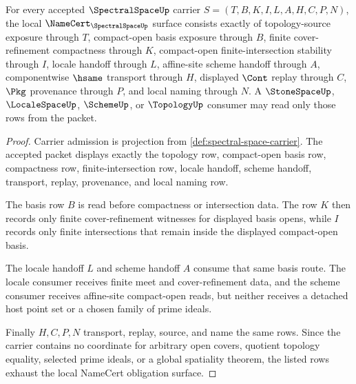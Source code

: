 \begin{theorem}
\label{thm:spectral-space-namecert-obligations}
For every accepted $\SpectralSpaceUp$ carrier $S=(T,B,K,I,L,A,H,C,P,N)$, the local $\NameCert_{\SpectralSpaceUp}$ surface consists exactly of topology-source exposure through $T$, compact-open basis exposure through $B$, finite cover-refinement compactness through $K$, compact-open finite-intersection stability through $I$, locale handoff through $L$, affine-site scheme handoff through $A$, componentwise $\hsame$ transport through $H$, displayed $\Cont$ replay through $C$, $\Pkg$ provenance through $P$, and local naming through $N$. A $\StoneSpaceUp$, $\LocaleSpaceUp$, $\SchemeUp$, or $\TopologyUp$ consumer may read only those rows from the packet.
\end{theorem}
\begin{proof}
Carrier admission is projection from \autoref{def:spectral-space-carrier}. The accepted packet displays exactly the topology row, compact-open basis row, compactness row, finite-intersection row, locale handoff, scheme handoff, transport, replay, provenance, and local naming row.

The basis row $B$ is read before compactness or intersection data. The row $K$ then records only finite cover-refinement witnesses for displayed basis opens, while $I$ records only finite intersections that remain inside the displayed compact-open basis.

The locale handoff $L$ and scheme handoff $A$ consume that same basis route. The locale consumer receives finite meet and cover-refinement data, and the scheme consumer receives affine-site compact-open reads, but neither receives a detached host point set or a chosen family of prime ideals.

Finally $H,C,P,N$ transport, replay, source, and name the same rows. Since the carrier contains no coordinate for arbitrary open covers, quotient topology equality, selected prime ideals, or a global spatiality theorem, the listed rows exhaust the local NameCert obligation surface.
\end{proof}

